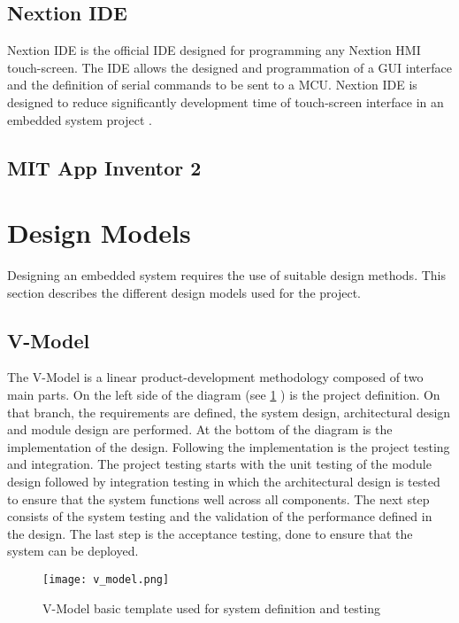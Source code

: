 \subsection{Nextion IDE}\label{nextion}
Nextion IDE is the official IDE designed for programming any Nextion HMI touch-screen. The IDE allows the designed and programmation of a GUI interface and the definition of serial commands to be sent to a MCU. Nextion IDE is designed to reduce significantly development time of touch-screen interface in an embedded system project \cite{nextion}. 

\subsection{MIT App Inventor 2}


\section{Design Models}
Designing an embedded system requires the use of suitable design methods. This section describes the different design models used for the project.

\subsection{V-Model}
The V-Model is a linear product-development methodology composed of two main parts. On the left side of the diagram (see \cref{fig:v_model} ) is the project definition. On that branch, the requirements are defined, the system design, architectural design and module design are performed. At the bottom of the diagram is the implementation of the design. Following the implementation is the project testing and integration. The project testing starts with the unit testing of the module design followed by integration testing in which the architectural design is tested to ensure that the system functions well across all components. The next step consists of the system testing and the validation of the performance defined in the design. The last step is the acceptance testing, done to ensure that the system can be deployed.       
\begin{figure}[ht]
\centering
\texttt{[image: v\_model.png]}
\caption{V-Model basic template used for system definition and testing}
\label{fig:v_model}
\end{figure}

